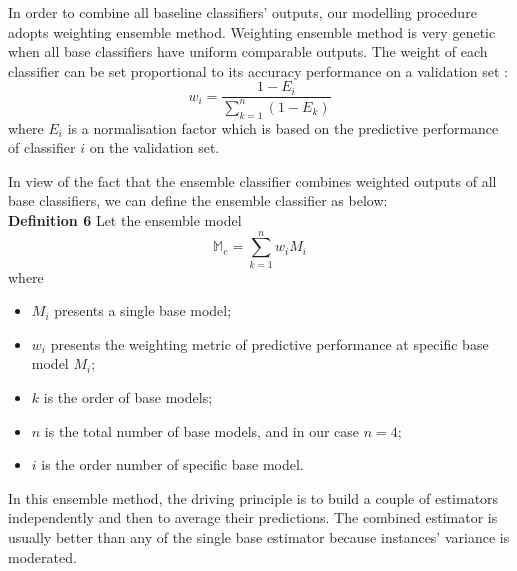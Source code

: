 \documentclass[10pt,journal,compsoc]{IEEEtran}
\begin{document}
In order to combine all baseline classifiers' outputs, our modelling procedure adopts weighting ensemble method. Weighting ensemble method is very genetic when all base classifiers have uniform comparable outputs. The weight of each classifier can be set proportional to its accuracy performance on a validation set \cite{Rokach}:\\
\begin{equation}\label{reio}
	w_{i} = \frac{1 - E_{i} }{\sum_{k = 1}^{n} (1 - E_{k}) } 
\end{equation}
where $E_{i} $ is a normalisation factor which is based on the predictive performance of classifier $i$ on the validation set. 

In view of the fact that the ensemble classifier combines weighted outputs of all base classifiers, we can define the ensemble classifier as below: \\
\textbf{Definition 6} Let the ensemble model \\
\begin{equation}\label{reio}
	\mathbb{M}_{e} = \sum_{k = 1}^{n} w_{i} M_{i} 
\end{equation}
where
\begin{itemize}
  \item $M_{i}$ presents a single base model;
  \item $w_{i}$ presents the weighting metric of predictive performance at specific base model $M_{i}$;
  \item $k$ is the order of base models;
  \item $n$ is the total number of base models, and in our case $n = 4$;
  \item $i$ is the order number of specific base model.\\
\end{itemize}

In this ensemble method, the driving principle is to build a couple of estimators independently and then to average their predictions. The combined estimator is usually better than any of the single base estimator because instances' variance is moderated.
%
%
\end{document}
